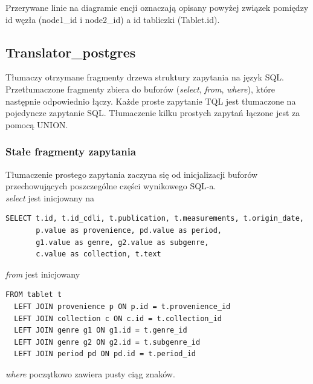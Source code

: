 Przerywane linie na diagramie encji oznaczają opisany powyżej związek pomiędzy id węzła (node1\_id i node2\_id) 
a id tabliczki (Tablet.id).


 

\subsection{Translator\_postgres}
Tłumaczy otrzymane fragmenty drzewa struktury zapytania na język SQL. Przetłumaczone fragmenty zbiera do buforów 
(\textit{select}, \textit{from}, \textit{where}), które następnie odpowiednio łączy.
Każde proste zapytanie TQL jest tłumaczone na pojedyncze zapytanie SQL. Tłumaczenie kilku prostych zapytań
łączone jest za pomocą UNION.

\subsubsection{Stałe fragmenty zapytania}
Tłumaczenie prostego zapytania zaczyna się od inicjalizacji buforów przechowujących poszczególne części wynikowego SQL-a.\\
\textit{select} jest inicjowany na 
\begin{verbatim}
SELECT t.id, t.id_cdli, t.publication, t.measurements, t.origin_date, 
       p.value as provenience, pd.value as period,
       g1.value as genre, g2.value as subgenre, 
       c.value as collection, t.text
\end{verbatim}
\textit{from} jest inicjowany
\begin{verbatim}
FROM tablet t
  LEFT JOIN provenience p ON p.id = t.provenience_id
  LEFT JOIN collection c ON c.id = t.collection_id
  LEFT JOIN genre g1 ON g1.id = t.genre_id
  LEFT JOIN genre g2 ON g2.id = t.subgenre_id
  LEFT JOIN period pd ON pd.id = t.period_id
\end{verbatim}
\textit{where} początkowo zawiera pusty ciąg znaków.



